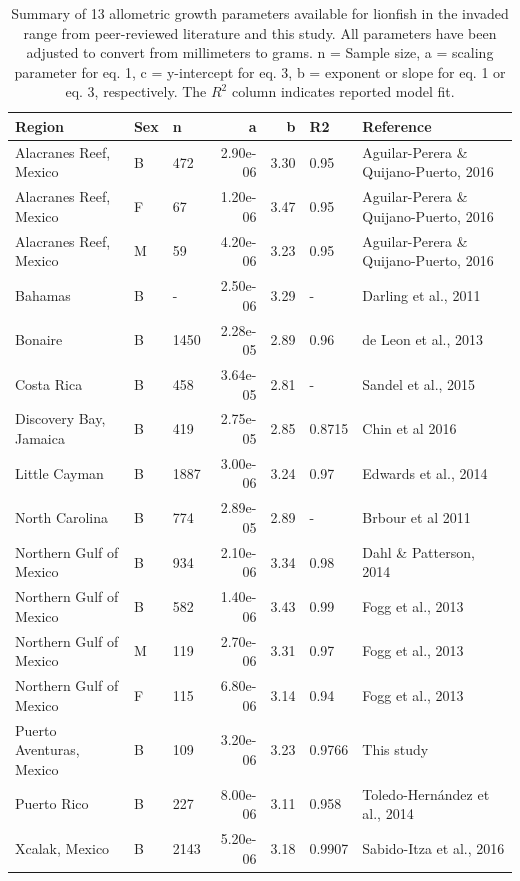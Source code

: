 \documentclass[fleqn,10pt,lineno]{wlpeerj} %
\begin{document}
\begin{table}

\caption{\label{tab:unnamed-chunk-4}\label{tab:all_params}Summary of 13 allometric growth parameters available for lionfish in the invaded range from peer-reviewed literature and this study. All parameters have been adjusted to convert from millimeters to grams. n = Sample size, a = scaling parameter for eq. 1, c = y-intercept for eq. 3, b = exponent or slope for eq. 1 or eq. 3, respectively. The $R^2$ column indicates reported model fit.}
\centering
\begin{tabular}[t]{lllrrll}
\toprule
Region & Sex & n & a & b & R2 & Reference\\
\midrule
Alacranes Reef, Mexico & B & 472 & 2.90e-06 & 3.30 & 0.95 & Aguilar-Perera \& Quijano-Puerto, 2016\\
Alacranes Reef, Mexico & F & 67 & 1.20e-06 & 3.47 & 0.95 & Aguilar-Perera \& Quijano-Puerto, 2016\\
Alacranes Reef, Mexico & M & 59 & 4.20e-06 & 3.23 & 0.95 & Aguilar-Perera \& Quijano-Puerto, 2016\\
Bahamas & B & - & 2.50e-06 & 3.29 & - & Darling et al., 2011\\
Bonaire & B & 1450 & 2.28e-05 & 2.89 & 0.96 & de Leon et al., 2013\\
\addlinespace
Costa Rica & B & 458 & 3.64e-05 & 2.81 & - & Sandel et al., 2015\\
Discovery Bay, Jamaica & B & 419 & 2.75e-05 & 2.85 & 0.8715 & Chin et al 2016\\
Little Cayman & B & 1887 & 3.00e-06 & 3.24 & 0.97 & Edwards et al., 2014\\
North Carolina & B & 774 & 2.89e-05 & 2.89 & - & Brbour et al 2011\\
Northern Gulf of Mexico & B & 934 & 2.10e-06 & 3.34 & 0.98 & Dahl \& Patterson, 2014\\
\addlinespace
Northern Gulf of Mexico & B & 582 & 1.40e-06 & 3.43 & 0.99 & Fogg et al., 2013\\
Northern Gulf of Mexico & M & 119 & 2.70e-06 & 3.31 & 0.97 & Fogg et al., 2013\\
Northern Gulf of Mexico & F & 115 & 6.80e-06 & 3.14 & 0.94 & Fogg et al., 2013\\
Puerto Aventuras, Mexico & B & 109 & 3.20e-06 & 3.23 & 0.9766 & This study\\
Puerto Rico & B & 227 & 8.00e-06 & 3.11 & 0.958 & Toledo-Hernández et al., 2014\\
Xcalak, Mexico & B & 2143 & 5.20e-06 & 3.18 & 0.9907 & Sabido-Itza et al., 2016\\
\bottomrule
\end{tabular}
\end{table}
\end{document}
